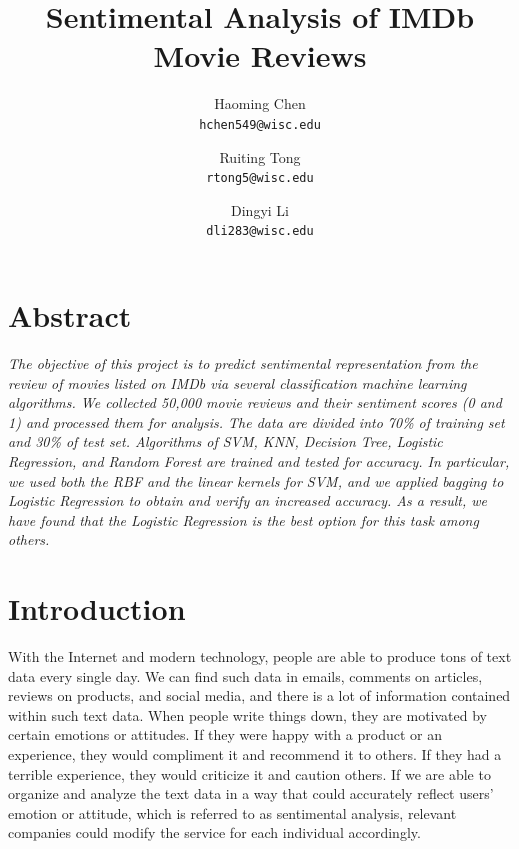 \documentclass[10pt,twocolumn,letterpaper]{article}
\begin{document}
	\title{\textbf{Sentimental Analysis of IMDb Movie Reviews}}
	\author{Haoming Chen\\
		{\tt\small hchen549@wisc.edu}
		\and
		Ruiting Tong\\
		{\tt\small rtong5@wisc.edu}
		\and
		Dingyi Li\\
		{\tt\small dli283@wisc.edu}
	}
	\date{}
	\maketitle
	
	\section*{Abstract} 
	\textit{The objective of this project is to predict sentimental representation from the review of movies listed on IMDb via several classification machine learning algorithms. We collected 50,000 movie reviews and their sentiment scores (0 and 1) and processed them for analysis. The data are divided into 70\% of training set and 30\% of test set. Algorithms of SVM, KNN, Decision Tree, Logistic Regression, and Random Forest are trained and tested for accuracy. In particular, we used both the RBF and the linear kernels for SVM, and we applied bagging to Logistic Regression to obtain and verify an increased accuracy. As a result, we have found that the Logistic Regression is the best option for this task among others.} 			
	
	\section{Introduction} 
	With the Internet and modern technology, people are able to produce tons of text data every single day. We can find such data in emails, comments on articles, reviews on products, and social media, and there is a lot of information contained within such text data. When people write things down, they are motivated by certain emotions or attitudes. If they were happy with a product or an experience, they would compliment it and recommend it to others. If they had a terrible experience, they would criticize it and caution others. If we are able to organize and analyze the text data in a way that could accurately reflect users’ emotion or attitude, which is referred to as sentimental analysis, relevant companies could modify the service for each individual accordingly.
	
\end{document}
